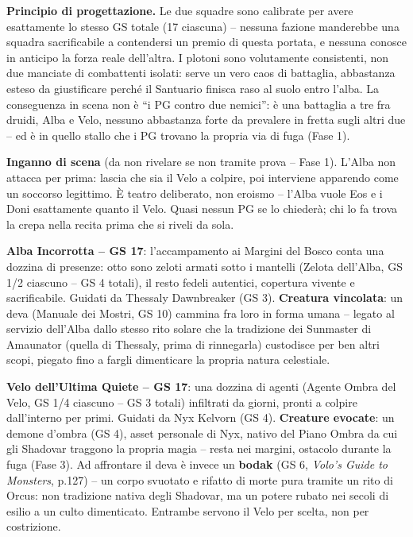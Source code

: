 \textbf{Principio di progettazione.} Le due squadre sono calibrate per avere esattamente lo stesso GS totale (17 ciascuna) -- nessuna fazione manderebbe una squadra sacrificabile a contendersi un premio di questa portata, e nessuna conosce in anticipo la forza reale dell'altra. I plotoni sono volutamente consistenti, non due manciate di combattenti isolati: serve un vero caos di battaglia, abbastanza esteso da giustificare perché il Santuario finisca raso al suolo entro l'alba. La conseguenza in scena non è ``i PG contro due nemici'': è una battaglia a tre fra druidi, Alba e Velo, nessuno abbastanza forte da prevalere in fretta sugli altri due -- ed è in quello stallo che i PG trovano la propria via di fuga (Fase 1).

\textbf{Inganno di scena} (da non rivelare se non tramite prova -- Fase 1). L'Alba non attacca per prima: lascia che sia il Velo a colpire, poi interviene apparendo come un soccorso legittimo. È teatro deliberato, non eroismo -- l'Alba vuole Eos e i Doni esattamente quanto il Velo. Quasi nessun PG se lo chiederà; chi lo fa trova la crepa nella recita prima che si riveli da sola.

\textbf{Alba Incorrotta -- GS 17}: l'accampamento ai Margini del Bosco conta una dozzina di presenze: otto sono zeloti armati sotto i mantelli (Zelota dell'Alba, GS 1/2 ciascuno -- GS 4 totali), il resto fedeli autentici, copertura vivente e sacrificabile. Guidati da Thessaly Dawnbreaker (GS 3). \textbf{Creatura vincolata}: un deva (Manuale dei Mostri, GS 10) cammina fra loro in forma umana -- legato al servizio dell'Alba dallo stesso rito solare che la tradizione dei Sunmaster di Amaunator (quella di Thessaly, prima di rinnegarla) custodisce per ben altri scopi, piegato fino a fargli dimenticare la propria natura celestiale.

\textbf{Velo dell'Ultima Quiete -- GS 17}: una dozzina di agenti (Agente Ombra del Velo, GS 1/4 ciascuno -- GS 3 totali) infiltrati da giorni, pronti a colpire dall'interno per primi. Guidati da Nyx Kelvorn (GS 4). \textbf{Creature evocate}: un demone d'ombra (GS 4), asset personale di Nyx, nativo del Piano Ombra da cui gli Shadovar traggono la propria magia -- resta nei margini, ostacolo durante la fuga (Fase 3). Ad affrontare il deva è invece un \textbf{bodak} (GS 6, \textit{Volo's Guide to Monsters}, p.127) -- un corpo svuotato e rifatto di morte pura tramite un rito di Orcus: non tradizione nativa degli Shadovar, ma un potere rubato nei secoli di esilio a un culto dimenticato. Entrambe servono il Velo per scelta, non per costrizione.

